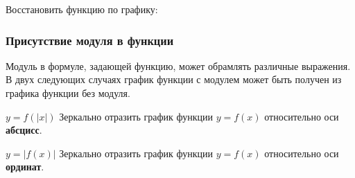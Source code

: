 \documentclass[algebra,twocolumn]{pum}
\begin{document}
  \begin{exercises}
    \begin{question}
      Восстановить функцию по графику:

    \end{question}
  \end{exercises}

\subsubsection*{Присутствие модуля в функции}
Модуль в формуле, задающей функцию, может обрамлять различные выражения. В двух следующих случаях график функции с модулем может быть получен из графика функции без модуля.
\begin{pumbox}{{$y=f(|x|)$}}
  Зеркально отразить график функции $y=f(x)$ относительно оси {\bf абсцисс}.
\end{pumbox}
\begin{pumbox}{{$y=|f(x)|$}}
  Зеркально отразить график функции $y=f(x)$ относительно оси {\bf ординат}.
\end{pumbox}
\end{document}
